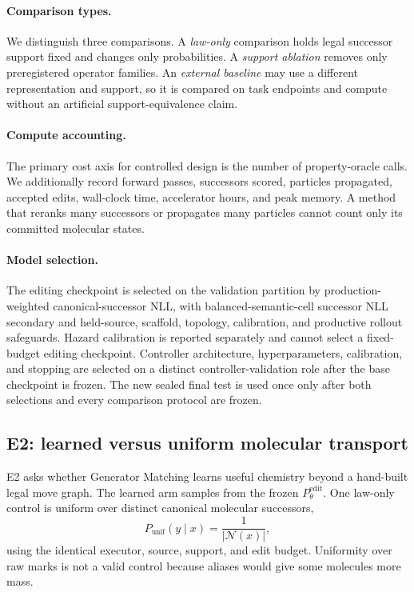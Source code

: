 \paragraph{Comparison types.}
We distinguish three comparisons. A \emph{law-only} comparison holds legal
successor support fixed and changes only probabilities. A \emph{support
ablation} removes only preregistered operator families. An \emph{external
baseline} may use a different representation and support, so it is compared on
task endpoints and compute without an artificial support-equivalence claim.

\paragraph{Compute accounting.}
The primary cost axis for controlled design is the number of property-oracle
calls. We additionally record forward passes, successors scored, particles
propagated, accepted edits, wall-clock time, accelerator hours, and peak memory.
A method that reranks many successors or propagates many particles cannot count
only its committed molecular states.

\paragraph{Model selection.}
The editing checkpoint is selected on the validation partition by
production-weighted canonical-successor NLL, with balanced-semantic-cell
successor NLL secondary and held-source, scaffold, topology, calibration, and productive
rollout safeguards. Hazard calibration is reported separately and cannot
select a fixed-budget editing checkpoint. Controller architecture,
hyperparameters, calibration, and stopping are selected on a distinct
controller-validation role after the base checkpoint is frozen. The new sealed
final test is used once only after both selections and every comparison
protocol are frozen.

\subsection{E2: learned versus uniform molecular transport}

E2 asks whether Generator Matching learns useful chemistry beyond a hand-built
legal move graph. The learned arm samples from the frozen
$P_\theta^{\mathrm{edit}}$. One law-only control is uniform over distinct
canonical molecular successors,
\[
  P_{\mathrm{unif}}(y\mid x)
  =
  \frac{1}{|\mathcal N(x)|},
\]
using the identical executor, source, support, and edit budget. Uniformity over
raw marks is not a valid control because aliases would give some molecules more
mass.

